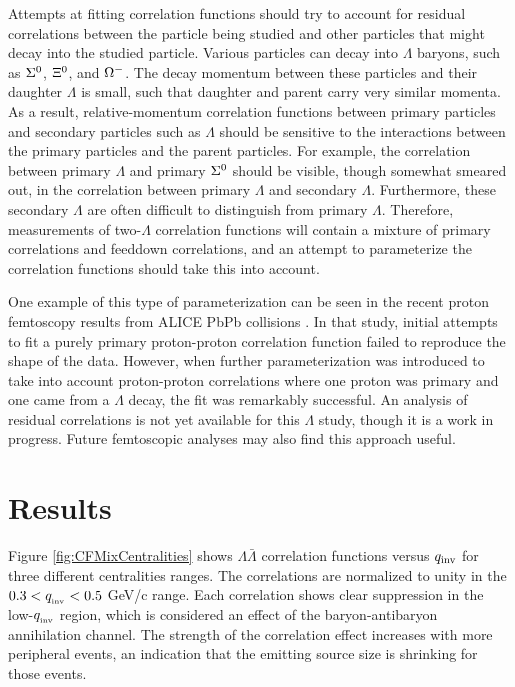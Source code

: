Attempts at fitting correlation functions should try to account for residual correlations between the particle being studied and other particles that might decay into the studied particle.  Various particles can decay into $\Lambda$ baryons, such as $\Sigma^{\rm 0}$, $\Xi^{\rm 0}$, and $\Omega^{\rm -}$.  The decay momentum between these particles and their daughter $\Lambda$ is small, such that daughter and parent carry very similar momenta.  As a result, relative-momentum correlation functions between primary particles and secondary particles such as $\Lambda$ should be sensitive to the interactions between the primary particles and the parent particles.  For example, the correlation between primary $\Lambda$ and primary $\Sigma^{\rm 0}$ should be visible, though somewhat smeared out, in the correlation between primary $\Lambda$ and secondary $\Lambda$.  Furthermore, these secondary $\Lambda$ are often difficult to distinguish from primary $\Lambda$.  Therefore, measurements of two-$\Lambda$ correlation functions will contain a mixture of primary correlations and feeddown correlations, and an attempt to parameterize the correlation functions should take this into account.  

One example of this type of parameterization can be seen in the recent proton femtoscopy results from ALICE PbPb collisions \cite{Szymanski:2012AN}.  In that study, initial attempts to fit a purely primary proton-proton correlation function failed to reproduce the shape of the data.  However, when further parameterization was introduced to take into account proton-proton correlations where one proton was primary and one came from a $\Lambda$ decay, the fit was remarkably successful.  An analysis of residual correlations is not yet available for this $\Lambda$ study, though it is a work in progress.  Future femtoscopic analyses may also find this approach useful.

\section{Results}
\label{sec:Results}

Figure \ref{fig:CFMixCentralities} shows $\Lambda\bar{\Lambda}$ correlation functions versus $q_{\rm inv}$ for three different centralities ranges.  The correlations are normalized to unity in the $ 0.3 < q_{\rm_{inv}} < 0.5$ GeV/c range.  Each correlation shows clear suppression in the low-$q_{\rm_{inv}}$ region, which is considered an effect of the baryon-antibaryon annihilation channel.  The strength of the correlation effect increases with more peripheral events, an indication that the emitting source size is shrinking for those events.

